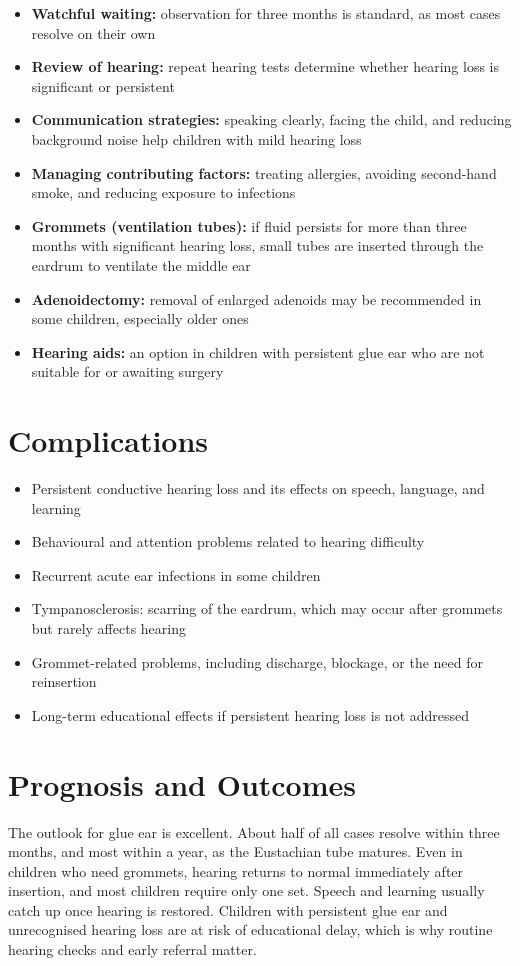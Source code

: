 \begin{itemize}
    \item \textbf{Watchful waiting:} observation for three months is standard, as most cases resolve on their own
    \item \textbf{Review of hearing:} repeat hearing tests determine whether hearing loss is significant or persistent
    \item \textbf{Communication strategies:} speaking clearly, facing the child, and reducing background noise help children with mild hearing loss
    \item \textbf{Managing contributing factors:} treating allergies, avoiding second-hand smoke, and reducing exposure to infections
    \item \textbf{Grommets (ventilation tubes):} if fluid persists for more than three months with significant hearing loss, small tubes are inserted through the eardrum to ventilate the middle ear
    \item \textbf{Adenoidectomy:} removal of enlarged adenoids may be recommended in some children, especially older ones
    \item \textbf{Hearing aids:} an option in children with persistent glue ear who are not suitable for or awaiting surgery
\end{itemize}

\section*{Complications}
\begin{itemize}
    \item Persistent conductive hearing loss and its effects on speech, language, and learning
    \item Behavioural and attention problems related to hearing difficulty
    \item Recurrent acute ear infections in some children
    \item Tympanosclerosis: scarring of the eardrum, which may occur after grommets but rarely affects hearing
    \item Grommet-related problems, including discharge, blockage, or the need for reinsertion
    \item Long-term educational effects if persistent hearing loss is not addressed
\end{itemize}

\section*{Prognosis and Outcomes}
The outlook for glue ear is excellent. About half of all cases resolve within three months, and most within a year, as the Eustachian tube matures. Even in children who need grommets, hearing returns to normal immediately after insertion, and most children require only one set. Speech and learning usually catch up once hearing is restored. Children with persistent glue ear and unrecognised hearing loss are at risk of educational delay, which is why routine hearing checks and early referral matter.

